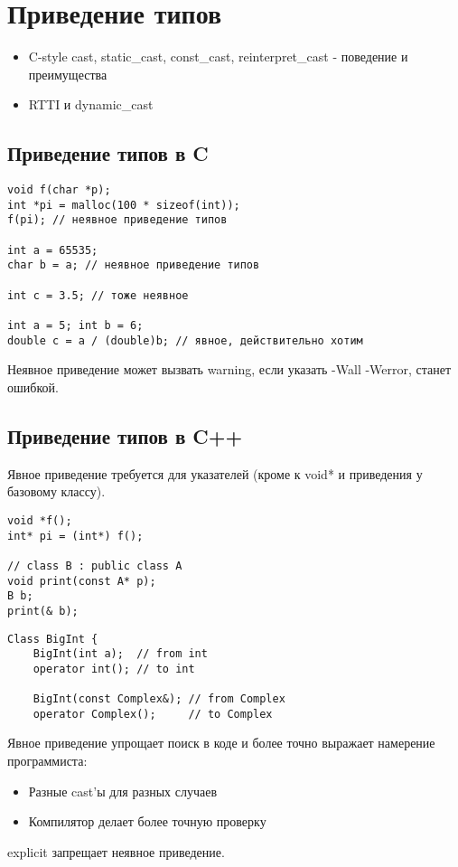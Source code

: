 \section{Приведение типов}
\begin{itemize}[noitemsep]
    \item C-style cast, static\_cast, const\_cast, reinterpret\_cast - поведение и преимущества
    \item RTTI и dynamic\_cast
\end{itemize}
\subsection{Приведение типов в C}
\begin{verbatim}
void f(char *p);
int *pi = malloc(100 * sizeof(int));
f(pi); // неявное приведение типов

int a = 65535;
char b = a; // неявное приведение типов

int c = 3.5; // тоже неявное

int a = 5; int b = 6;
double c = a / (double)b; // явное, действительно хотим
\end{verbatim}
Неявное приведение может вызвать warning, если указать -Wall -Werror, станет ошибкой.
\subsection{Приведение типов в C++}
Явное приведение требуется для указателей (кроме к void* и приведения у базовому классу).
\begin{verbatim}
void *f();
int* pi = (int*) f();

// class B : public class A
void print(const A* p);
B b;
print(& b);
\end{verbatim}
\begin{verbatim}
Class BigInt {
    BigInt(int a);  // from int
    operator int(); // to int

    BigInt(const Complex&); // from Complex
    operator Complex();     // to Complex
\end{verbatim}
Явное приведение упрощает поиск в коде и более точно выражает намерение программиста:
\begin{itemize}[noitemsep]
    \item Разные cast'ы для разных случаев
    \item Компилятор делает более точную проверку
\end{itemize}
explicit запрещает неявное приведение.
